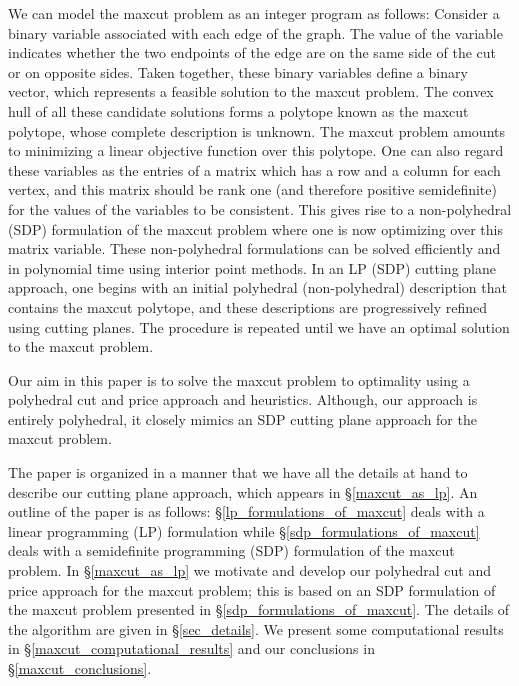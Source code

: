 \documentclass[12pt]{article}
\begin{document}
We can model the maxcut problem as an integer program as follows:
Consider a binary variable associated with each edge of the graph.
The value of the variable indicates whether the two endpoints of
the edge are on the same side of the cut or on opposite sides.
Taken together, these binary variables define a binary vector,
which represents a  feasible solution to the maxcut problem. The
convex hull of all these candidate solutions forms a polytope
known as the maxcut polytope, whose complete description is
unknown. The maxcut problem amounts to minimizing a linear
objective function over this polytope. One can also regard these
variables as the entries of a matrix which has a row and a column
for each vertex, and this matrix should be rank one (and therefore
positive semidefinite) for the values of the variables to be
consistent. This gives rise to a non-polyhedral (SDP) formulation
of the maxcut problem where one is now optimizing over this matrix
variable. These non-polyhedral formulations can be solved
efficiently and in polynomial time using interior point methods.
In an LP (SDP) cutting plane approach, one begins with an initial
polyhedral (non-polyhedral) description that contains the maxcut
polytope, and these descriptions are progressively refined using
cutting planes. The procedure is repeated until we have an optimal
solution to the maxcut problem.

Our aim in this paper is to solve the maxcut problem to optimality
using a polyhedral cut and price approach and heuristics.
Although, our approach is entirely polyhedral, it closely mimics
an SDP cutting plane approach for the maxcut problem.

The paper is organized in a manner that we have all the details at
hand to describe our cutting plane approach, which appears in
\S\ref{maxcut_as_lp}. An outline of the paper is as follows:
\S\ref{lp_formulations_of_maxcut} deals with a linear programming
(LP) formulation  while \S\ref{sdp_formulations_of_maxcut} deals
with a semidefinite programming (SDP) formulation of the maxcut
problem. In \S\ref{maxcut_as_lp} we motivate and develop our
polyhedral cut and price approach for the maxcut problem; this is
based on an SDP formulation of the maxcut problem presented in
\S\ref{sdp_formulations_of_maxcut}. The details of the algorithm
are given in \S\ref{sec_details}. We present some computational
results in \S\ref{maxcut_computational_results} and our
conclusions in \S\ref{maxcut_conclusions}.
\end{document}
